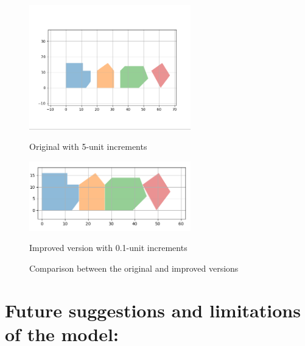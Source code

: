 \documentclass[a4paper]{article}
\begin{document}
\begin{figure}[h]
    \centering
    \begin{minipage}[b]{0.45\textwidth}
        \centering
        \includegraphics[width=7cm]{Image_5}
        \caption{Original with 5-unit increments}
        \label{fig:original}
    \end{minipage}
    \hfill
    \begin{minipage}[b]{0.45\textwidth}
        \centering
        \includegraphics[width=7cm]{Image_7}
        \caption{Improved version with 0.1-unit increments}
        \label{fig:improved}
    \end{minipage}
    \caption{Comparison between the original and improved versions}
    \label{fig:comparison}
\end{figure}

\section{Future suggestions and limitations of the model: }
\end{document}

